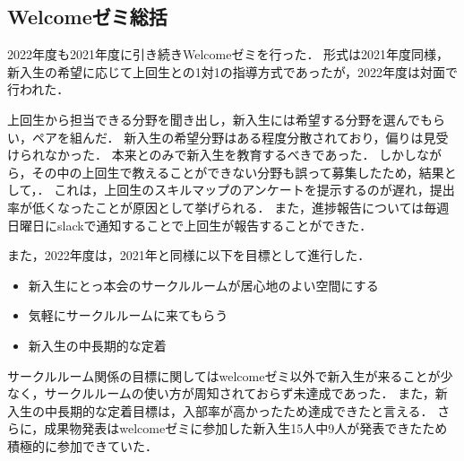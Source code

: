 \subsection*{Welcomeゼミ総括}


2022年度も2021年度に引き続きWelcomeゼミを行った．
形式は2021年度同様，新入生の希望に応じて上回生との1対1の指導方式であったが，2022年度は対面で行われた．

上回生から担当できる分野を聞き出し，新入生には希望する分野を選んでもらい，ペアを組んだ．
新入生の希望分野はある程度分散されており，偏りは見受けられなかった．
本来\secondGrade{}と\thirdGrade{}のみで新入生を教育するべきであった．
しかしながら，その中の上回生で教えることができない分野も誤って募集したため，結果として，．
これは，上回生のスキルマップのアンケートを提示するのが遅れ，提出率が低くなったことが原因として挙げられる．
また，進捗報告については毎週日曜日にslackで通知することで上回生が報告することができた．

また，2022年度は，2021年と同様に以下を目標として進行した．
\begin{itemize}
	\item 新入生にとっ本会のサークルルームが居心地のよい空間にする
	\item 気軽にサークルルームに来てもらう
	\item 新入生の中長期的な定着
\end{itemize}

サークルルーム関係の目標に関してはwelcomeゼミ以外で新入生が来ることが少なく，サークルルームの使い方が周知されておらず未達成であった．
また，新入生の中長期的な定着目標は，入部率が高かったため達成できたと言える．
さらに，成果物発表はwelcomeゼミに参加した新入生15人中9人が発表できたため積極的に参加できていた．
